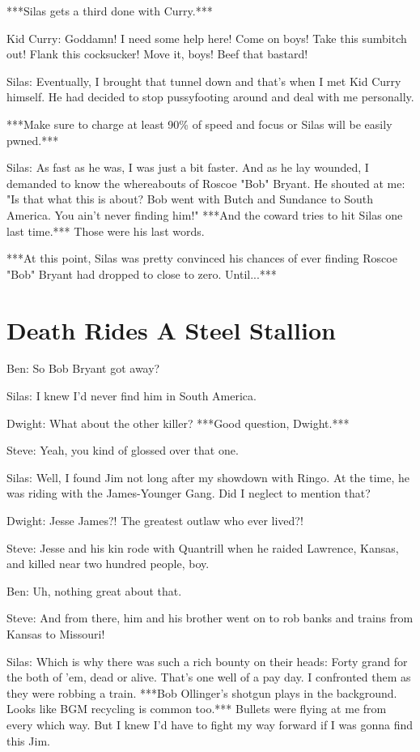 \documentclass{article}
\begin{document}
***Silas gets a third done with Curry.***

Kid Curry: Goddamn! I need some help here! Come on boys! Take this sumbitch out! Flank this cocksucker! Move it, boys! Beef that bastard!

Silas: Eventually, I brought that tunnel down and that's when I met Kid Curry himself. He had decided to stop pussyfooting around and deal with me personally.

***Make sure to charge at least 90\% of speed and focus or Silas will be easily pwned.***

Silas: As fast as he was, I was just a bit faster. And as he lay wounded, I demanded to know the whereabouts of Roscoe "Bob" Bryant. He shouted at me: "Is that what this is about? Bob went with Butch and Sundance to South America. You ain't never finding him!" ***And the coward tries to hit Silas one last time.*** Those were his last words.

***At this point, Silas was pretty convinced his chances of ever finding Roscoe "Bob" Bryant had dropped to close to zero. Until...***

\section*{Death Rides A Steel Stallion}

Ben: So Bob Bryant got away?

Silas: I knew I'd never find him in South America.

Dwight: What about the other killer? ***Good question, Dwight.***

Steve: Yeah, you kind of glossed over that one.

Silas: Well, I found Jim not long after my showdown with Ringo. At the time, he was riding with the James-Younger Gang. Did I neglect to mention that?

Dwight: Jesse James?! The greatest outlaw who ever lived?!

Steve: Jesse and his kin rode with Quantrill when he raided Lawrence, Kansas, and killed near two hundred people, boy.

Ben: Uh, nothing great about that.

Steve: And from there, him and his brother went on to rob banks and trains from Kansas to Missouri!

Silas: Which is why there was such a rich bounty on their heads: Forty grand for the both of 'em, dead or alive. That's one well of a pay day. I confronted them as they were robbing a train. ***Bob Ollinger's shotgun plays in the background. Looks like BGM recycling is common too.*** Bullets were flying at me from every which way. But I knew I'd have to fight my way forward if I was gonna find this Jim.
\end{document}
